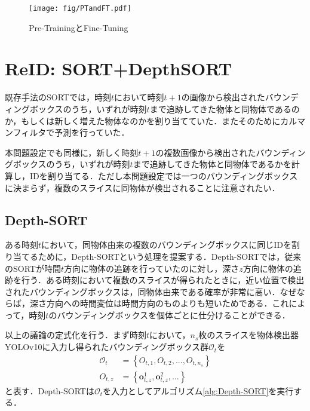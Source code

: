 \begin{figure}[t]
    \centering    
    \texttt{[image: fig/PTandFT.pdf]}
    \caption{Pre-TrainingとFine-Tuning}
    \label{fig:PTandFT}
\end{figure}

\section{ReID: SORT+DepthSORT}
既存手法のSORTでは，時刻$t$において時刻$t+1$の画像から検出されたバウンディングボックスのうち，いずれが時刻$t$まで追跡してきた物体と同物体であるのか，もしくは新しく増えた物体なのかを割り当てていた．またそのためにカルマンフィルタで予測を行っていた．
\par
本問題設定でも同様に，新しく時刻$t+1$の複数画像から検出されたバウンディングボックスのうち，いずれが時刻$t$まで追跡してきた物体と同物体であるかを計算し，IDを割り当てる．ただし本問題設定では一つのバウンディングボックスに決まらず，複数のスライスに同物体が検出されることに注意されたい．

\subsection{Depth-SORT}

ある時刻$t$において，同物体由来の複数のバウンディングボックスに同じIDを割り当てるために，Depth-SORTという処理を提案する．Depth-SORTでは，従来のSORTが時間$t$方向に物体の追跡を行っていたのに対し，深さ$z$方向に物体の追跡を行う．ある時刻において複数のスライスが得られたときに，近い位置で検出されたバウンディングボックスは，同物体由来である確率が非常に高い．なぜならば，深さ方向への時間変位は時間方向のものよりも短いためである．これによって，時刻$t$のバウンディングボックスを個体ごとに仕分けることができる．
\par
以上の議論の定式化を行う．まず時刻$t$において，$n_s$枚のスライスを物体検出器YOLOv10に入力し得られたバウンディングボックス群$\mathcal{O}_t$を
\begin{equation}
    \begin{aligned}
        \mathcal{O}_t &= \left\{O_{t, 1}, O_{t,2},...,O_{t,n_s}\right\}
        \\ O_{t,z} &= \left\{\bm{o}_{t,z}^1, \bm{o}_{t,z}^2,...\right\}
    \end{aligned}
\end{equation}
と表す．Depth-SORTは$\mathcal{O}_t$を入力としてアルゴリズム\ref{alg:Depth-SORT}を実行する．

